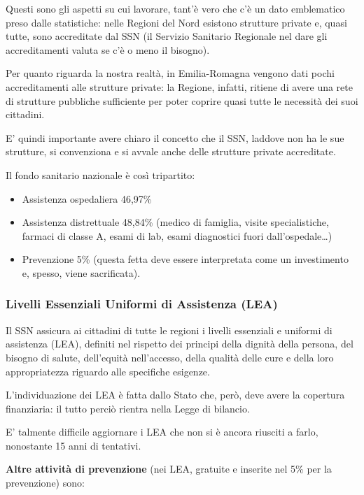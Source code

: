 Questi sono gli aspetti su cui lavorare, tant'è vero che c'è un dato emblematico preso dalle statistiche: nelle Regioni del Nord esistono strutture private e, quasi tutte, sono accreditate dal SSN (il Servizio Sanitario Regionale nel dare gli accreditamenti valuta se c'è o meno il bisogno).

Per quanto riguarda la nostra realtà, in Emilia-Romagna vengono dati pochi accreditamenti alle strutture private: la Regione, infatti, ritiene di avere una rete di strutture pubbliche sufficiente per poter coprire quasi tutte le necessità dei suoi cittadini.

E' quindi importante avere chiaro il concetto che il SSN, laddove non ha le sue strutture, si convenziona e si avvale anche delle strutture private accreditate.

Il fondo sanitario nazionale è così tripartito:

\begin{itemize}
\item
  Assistenza ospedaliera 46,97\%
\item
  Assistenza distrettuale 48,84\% (medico di famiglia, visite
  specialistiche, farmaci di classe A, esami di lab, esami diagnostici
  fuori dall'ospedale\ldots{})
\item
  Prevenzione 5\% (questa fetta deve essere interpretata come un
  investimento e, spesso, viene sacrificata).
\end{itemize}

\subsubsection{Livelli Essenziali Uniformi di Assistenza (LEA)}

Il SSN assicura ai cittadini di tutte le regioni i livelli essenziali e uniformi di assistenza (LEA), definiti nel rispetto dei principi della dignità della persona, del bisogno di salute, dell'equità nell'accesso, della qualità delle cure e della loro appropriatezza riguardo alle specifiche esigenze.

L'individuazione dei LEA è fatta dallo Stato che, però, deve avere la copertura finanziaria: il tutto perciò rientra nella Legge di bilancio.

E' talmente difficile aggiornare i LEA che non si è ancora riusciti a farlo, nonostante 15 anni di tentativi.

\textbf{Altre attività di prevenzione} (nei LEA, gratuite e inserite nel 5\% per la prevenzione) sono:

